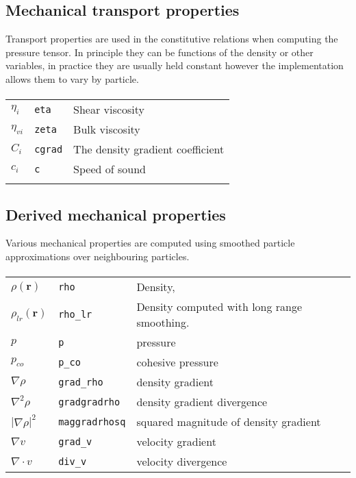 \subsection{Mechanical transport properties}
Transport properties are used in the constitutive relations when computing the 
pressure tensor. In principle they can be functions of the density or other 
variables, in practice they are usually held constant however the implementation 
allows them to vary by particle.

\paragraph{}
\begin{tabularx}{\textwidth}{lll} \toprule
$\eta_i$ & \texttt{eta} &  Shear viscosity \\
$\eta_{vi}$ & \texttt{zeta} & Bulk viscosity \\
$C_i$ & \texttt{cgrad} & The density gradient coefficient \\
$c_i$ & \texttt{c} & Speed of sound \\
& & \\
\end{tabularx}

\subsection{Derived mechanical properties}
Various mechanical properties are computed using smoothed particle
approximations over neighbouring particles.

\paragraph{}
\begin{tabularx}{\textwidth}{lll} \toprule
$\rho(\mathbold{r}) $       & \texttt{rho} & Density, \\
$\rho_{lr}(\mathbold{r}) $  & \texttt{rho\_lr} & Density computed with long range smoothing. \\
$p$                  & \texttt{p} & pressure \\
$p_{co}$         & \texttt{p\_co} & cohesive pressure  \\
$\nabla \rho$ & \texttt{grad\_rho} & density gradient  \\
$\nabla^{2} \rho$ & \texttt{gradgradrho} & density gradient divergence \\
$| \nabla \rho |^{2} $ & \texttt{maggradrhosq} & squared magnitude of density gradient\\
$\nabla v$      & \texttt{grad\_v}         & velocity gradient \\
$\nabla \cdot v$      & \texttt{div\_v}         & velocity divergence\\
\end{tabularx}

